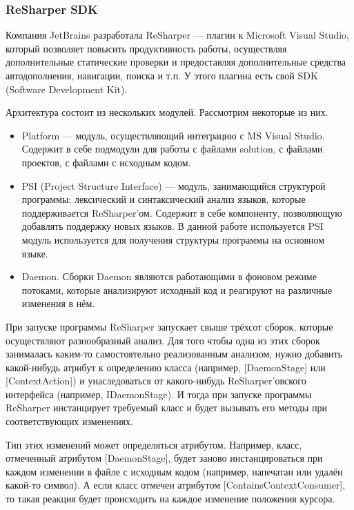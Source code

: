 \subsubsection{ReSharper SDK}

Компания JetBrains разработала ReSharper --- плагин к Microsoft Visual Studio, который позволяет повысить продуктивность работы, осуществляя дополнительные статические проверки и предоставляя дополнительные средства автодополнения, навигации, поиска и т.п.
У этого плагина есть свой SDK (Software Development Kit).  

Архитектура состоит из нескольких модулей. Рассмотрим некоторые из них.
\begin{itemize}
\item Platform --- модуль, осуществляющий интеграцию с MS Visual Studio. Содержит в себе подмодули для работы с файлами solution, с файлами проектов, с файлами с исходным кодом. 

\item PSI (Project Structure Interface) --- модуль, занимающийся структурой программы: лексический и синтаксический анализ языков, которые поддерживается ReSharper’ом. Содержит в себе компоненту, позволяющую добавлять поддержку новых языков. В данной работе используется PSI модуль используется для получения структуры программы на основном языке.

\item Daemon. Сборки Daemon являются работающими в фоновом режиме потоками, которые анализируют исходный код и реагируют на различные изменения в нём. 
	
\end{itemize}

При запуске программы ReSharper запускает свыше трёхсот сборок, которые осуществляют разнообразный анализ. Для того чтобы одна из этих сборок занималась каким-то самостоятельно реализованным анализом, нужно добавить какой-нибудь атрибут к определению класса (например, [DaemonStage] или [ContextAction]) и унаследоваться от какого-нибудь ReSharper’овского интерфейса (например, IDaemonStage). И тогда при запуске программы ReSharper инстанцирует требуемый класс и будет вызывать его методы при соответствующих изменениях. 

Тип этих изменений может определяться атрибутом. Например, класс, отмеченный атрибутом [DaemonStage], будет заново инстанцироваться при каждом изменении в файле с исходным кодом (например, напечатан или удалён какой-то символ). А если класс отмечен атрибутом [ContainsContextConsumer], то такая реакция будет происходить на каждое изменение положения курсора. 

